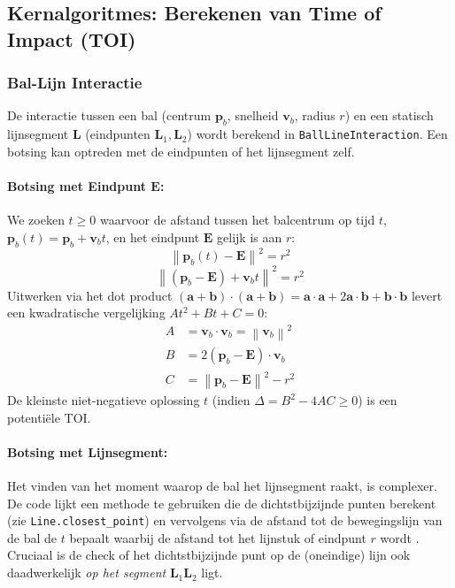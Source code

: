 \documentclass[11pt, a4paper]{article}
\newcommand{\vect}[1]{\mathbf{#1}}      %
\newcommand{\norm}[1]{\left\lVert#1\right\rVert} %
\begin{document}
\subsection{Kernalgoritmes: Berekenen van Time of Impact (TOI)} \label{ssec:kernalgoritmes}

\subsubsection{Bal-Lijn Interactie}
De interactie tussen een bal (centrum $\vect{p}_b$, snelheid $\vect{v}_b$, radius $r$) en een statisch lijnsegment $\vect{L}$ (eindpunten $\vect{L}_1, \vect{L}_2$) wordt berekend in \texttt{BallLineInteraction}. Een botsing kan optreden met de eindpunten of het lijnsegment zelf.

\paragraph{Botsing met Eindpunt $\vect{E}$:} We zoeken $t \ge 0$ waarvoor de afstand tussen het balcentrum op tijd $t$, $\vect{p}_b(t) = \vect{p}_b + \vect{v}_b t$, en het eindpunt $\vect{E}$ gelijk is aan $r$:
\[ \norm{\vect{p}_b(t) - \vect{E}}^2 = r^2 \]
\[ \norm{(\vect{p}_b - \vect{E}) + \vect{v}_b t}^2 = r^2 \]
Uitwerken via het dot product $(\vect{a}+\vect{b}) \cdot (\vect{a}+\vect{b}) = \vect{a}\cdot\vect{a} + 2\vect{a}\cdot\vect{b} + \vect{b}\cdot\vect{b}$ levert een kwadratische vergelijking $At^2 + Bt + C = 0$:
\begin{align*}
    A &= \vect{v}_b \cdot \vect{v}_b = \norm{\vect{v}_b}^2 \\
    B &= 2 (\vect{p}_b - \vect{E}) \cdot \vect{v}_b \\
    C &= \norm{\vect{p}_b - \vect{E}}^2 - r^2
\end{align*}
De kleinste niet-negatieve oplossing $t$ (indien $\Delta = B^2 - 4AC \ge 0$) is een potentiële TOI.

\paragraph{Botsing met Lijnsegment:} Het vinden van het moment waarop de bal het lijnsegment raakt, is complexer. De code lijkt een methode te gebruiken die de dichtstbijzijnde punten berekent (zie \texttt{Line.closest\_point}) en vervolgens via de afstand tot de bewegingslijn van de bal de $t$ bepaalt waarbij de afstand tot het lijnstuk of eindpunt $r$ wordt \parencite{LeongCircleLine, FeronatoCircleLine}. Cruciaal is de check of het dichtstbijzijnde punt op de (oneindige) lijn ook daadwerkelijk \textit{op het segment} $\vect{L}_1\vect{L}_2$ ligt.
\end{document}
